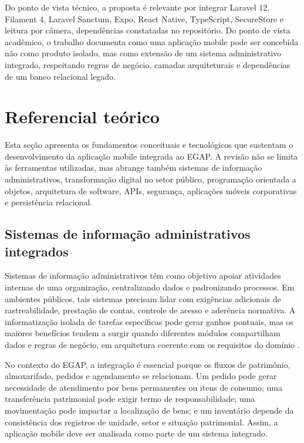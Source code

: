 \documentclass[12pt,a4paper]{article}
\begin{document}
Do ponto de vista técnico, a proposta é relevante por integrar Laravel 12, Filament 4, Laravel Sanctum, Expo, React Native, TypeScript, SecureStore e leitura por câmera, dependências constatadas no repositório. Do ponto de vista acadêmico, o trabalho documenta como uma aplicação mobile pode ser concebida não como produto isolado, mas como extensão de um sistema administrativo integrado, respeitando regras de negócio, camadas arquiteturais e dependências de um banco relacional legado.

\section{Referencial teórico}

Esta seção apresenta os fundamentos conceituais e tecnológicos que sustentam o desenvolvimento da aplicação mobile integrada ao EGAP. A revisão não se limita às ferramentas utilizadas, mas abrange também sistemas de informação administrativos, transformação digital no setor público, programação orientada a objetos, arquitetura de software, APIs, segurança, aplicações móveis corporativas e persistência relacional.

\subsection{Sistemas de informação administrativos integrados}

Sistemas de informação administrativos têm como objetivo apoiar atividades internas de uma organização, centralizando dados e padronizando processos. Em ambientes públicos, tais sistemas precisam lidar com exigências adicionais de rastreabilidade, prestação de contas, controle de acesso e aderência normativa. A informatização isolada de tarefas específicas pode gerar ganhos pontuais, mas os maiores benefícios tendem a surgir quando diferentes módulos compartilham dados e regras de negócio, em arquitetura coerente com os requisitos do domínio \cite{sommerville}.

No contexto do EGAP, a integração é essencial porque os fluxos de patrimônio, almoxarifado, pedidos e agendamento se relacionam. Um pedido pode gerar necessidade de atendimento por bens permanentes ou itens de consumo; uma transferência patrimonial pode exigir termo de responsabilidade; uma movimentação pode impactar a localização de bens; e um inventário depende da consistência dos registros de unidade, setor e situação patrimonial. Assim, a aplicação mobile deve ser analisada como parte de um sistema integrado.
\end{document}
